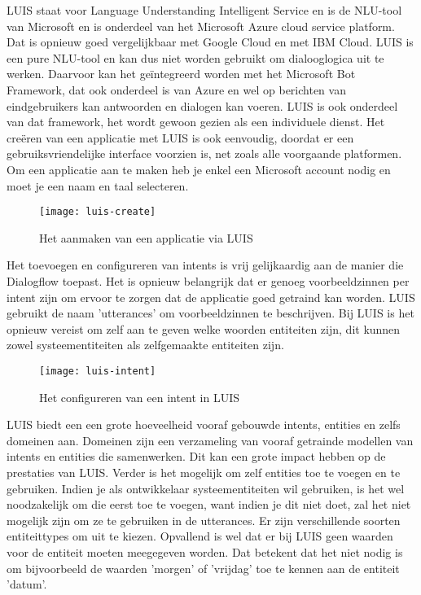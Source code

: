 LUIS staat voor Language Understanding Intelligent Service en is de NLU-tool van Microsoft en is onderdeel van het Microsoft Azure cloud service platform. Dat is opnieuw goed vergelijkbaar met Google Cloud en met IBM Cloud. LUIS is een pure NLU-tool en kan dus niet worden gebruikt om dialooglogica uit te werken. Daarvoor kan het geïntegreerd worden met het Microsoft Bot Framework, dat ook onderdeel is van Azure en wel op berichten van eindgebruikers kan antwoorden en dialogen kan voeren. LUIS is ook onderdeel van dat framework, het wordt gewoon gezien als een individuele dienst. Het creëren van een applicatie met LUIS is ook eenvoudig, doordat er een gebruiksvriendelijke interface voorzien is, net zoals alle voorgaande platformen. Om een applicatie aan te maken heb je enkel een Microsoft account nodig en moet je een naam en taal selecteren.

\begin{figure}[H]
    \label{fig:luis-create}
    \centering
    \texttt{[image: luis-create]}
    \caption{Het aanmaken van een applicatie via LUIS}
\end{figure}

Het toevoegen en configureren van intents is vrij gelijkaardig aan de manier die Dialogflow toepast. Het is opnieuw belangrijk dat er genoeg voorbeeldzinnen per intent zijn om ervoor te zorgen dat de applicatie goed getraind kan worden. LUIS gebruikt de naam 'utterances' om voorbeeldzinnen te beschrijven. Bij LUIS is het opnieuw vereist om zelf aan te geven welke woorden entiteiten zijn, dit kunnen zowel systeementiteiten als zelfgemaakte entiteiten zijn.

\begin{figure}[H]
    \label{fig:luis-intent}
    \centering
    \texttt{[image: luis-intent]}
    \caption{Het configureren van een intent in LUIS}
\end{figure}

LUIS biedt een een grote hoeveelheid vooraf gebouwde intents, entities en zelfs domeinen aan. Domeinen zijn een verzameling van vooraf getrainde modellen van intents en entities die samenwerken. Dit kan een grote impact hebben op de prestaties van LUIS. Verder is het mogelijk om zelf entities toe te voegen en te gebruiken. Indien je als ontwikkelaar systeementiteiten wil gebruiken, is het wel noodzakelijk om die eerst toe te voegen, want indien je dit niet doet, zal het niet mogelijk zijn om ze te gebruiken in de utterances. Er zijn verschillende soorten entiteittypes om uit te kiezen. Opvallend is wel dat er bij LUIS geen waarden voor de entiteit moeten meegegeven worden. Dat betekent dat het niet nodig is om bijvoorbeeld de waarden 'morgen' of 'vrijdag' toe te kennen aan de entiteit 'datum'.

